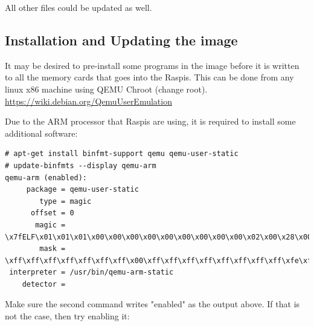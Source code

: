 %

All other files could be updated as well.

\subsection{Installation and Updating the image}

It may be desired to pre-install some programs in the image before it is
written to all the memory cards that goes into the \ac{Raspi}s.
This can be done from any linux x86 machine using QEMU Chroot (change root).
\url{https://wiki.debian.org/QemuUserEmulation}

Due to the \ac{ARM} processor that \ac{Raspi}s are using, it is required to
install some additional software:

\begin{lstlisting}[]
# apt-get install binfmt-support qemu qemu-user-static
# update-binfmts --display qemu-arm
qemu-arm (enabled):
     package = qemu-user-static
        type = magic
      offset = 0
       magic = \x7fELF\x01\x01\x01\x00\x00\x00\x00\x00\x00\x00\x00\x00\x02\x00\x28\x00
        mask = \xff\xff\xff\xff\xff\xff\xff\x00\xff\xff\xff\xff\xff\xff\xff\xff\xfe\xff\xff\xff
 interpreter = /usr/bin/qemu-arm-static
    detector = 
\end{lstlisting}
\FloatBarrier

Make sure the second command writes "enabled" as the output above. If that 
is not the case, then try enabling it:

